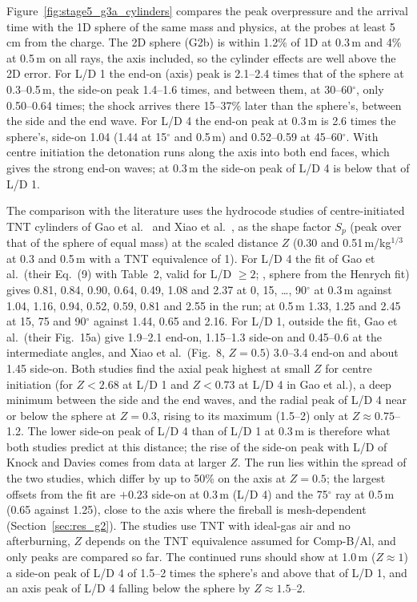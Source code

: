 \documentclass{article}
\begin{document}
Figure~\ref{fig:stage5_g3a_cylinders} compares the peak overpressure and the arrival time with the 1D sphere of the same mass and physics, at the probes at least 5\,cm from the charge. The 2D sphere (G2b) is within 1.2\% of 1D at 0.3\,m and 4\% at 0.5\,m on all rays, the axis included, so the cylinder effects are well above the 2D error. For L/D 1 the end-on (axis) peak is 2.1--2.4 times that of the sphere at 0.3--0.5\,m, the side-on peak 1.4--1.6 times, and between them, at 30--60$^\circ$, only 0.50--0.64 times; the shock arrives there 15--37\% later than the sphere's, between the side and the end wave. For L/D 4 the end-on peak at 0.3\,m is 2.6 times the sphere's, side-on 1.04 (1.44 at 15$^\circ$ and 0.5\,m) and 0.52--0.59 at 45--60$^\circ$. With centre initiation the detonation runs along the axis into both end faces, which gives the strong end-on waves; at 0.3\,m the side-on peak of L/D 4 is below that of L/D 1.

The comparison with the literature uses the hydrocode studies of centre-initiated TNT cylinders of Gao et al.\ \cite{gao2022} and Xiao et al.\ \cite{xiao2020}, as the shape factor $S_p$ (peak over that of the sphere of equal mass) at the scaled distance $Z$ (0.30 and 0.51\,m/kg$^{1/3}$ at 0.3 and 0.5\,m with a TNT equivalence of 1). For L/D 4 the fit of Gao et al.\ (their Eq.~(9) with Table~2, valid for L/D $\ge 2$; , sphere from the Henrych fit) gives 0.81, 0.84, 0.90, 0.64, 0.49, 1.08 and 2.37 at 0, 15, \dots, 90$^\circ$ at 0.3\,m against 1.04, 1.16, 0.94, 0.52, 0.59, 0.81 and 2.55 in the run; at 0.5\,m 1.33, 1.25 and 2.45 at 15, 75 and 90$^\circ$ against 1.44, 0.65 and 2.16. For L/D 1, outside the fit, Gao et al.\ (their Fig.~15a) give 1.9--2.1 end-on, 1.15--1.3 side-on and 0.45--0.6 at the intermediate angles, and Xiao et al.\ (Fig.~8, $Z = 0.5$) 3.0--3.4 end-on and about 1.45 side-on. Both studies find the axial peak highest at small $Z$ for centre initiation (for $Z < 2.68$ at L/D 1 and $Z < 0.73$ at L/D 4 in Gao et al.), a deep minimum between the side and the end waves, and the radial peak of L/D 4 near or below the sphere at $Z = 0.3$, rising to its maximum (1.5--2) only at $Z \approx 0.75$--1.2. The lower side-on peak of L/D 4 than of L/D 1 at 0.3\,m is therefore what both studies predict at this distance; the rise of the side-on peak with L/D of Knock and Davies \cite{knock2013} comes from data at larger $Z$. The run lies within the spread of the two studies, which differ by up to 50\% on the axis at $Z = 0.5$; the largest offsets from the fit are $+0.23$ side-on at 0.3\,m (L/D 4) and the 75$^\circ$ ray at 0.5\,m (0.65 against 1.25), close to the axis where the fireball is mesh-dependent (Section~\ref{sec:res_g2}). The studies use TNT with ideal-gas air and no afterburning, $Z$ depends on the TNT equivalence assumed for Comp-B/Al, and only peaks are compared so far. The continued runs should show at 1.0\,m ($Z \approx 1$) a side-on peak of L/D 4 of 1.5--2 times the sphere's and above that of L/D 1, and an axis peak of L/D 4 falling below the sphere by $Z \approx 1.5$--2.
\end{document}
